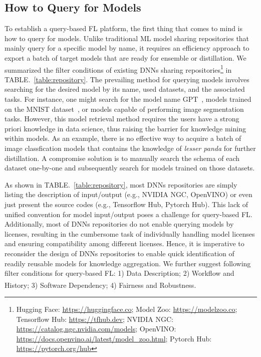 
\subsection{How to Query for Models}
\label{sec:how2query}
To establish a query-based FL platform, the first thing that comes to mind is how to query for models.
Unlike traditional ML model sharing repositories that mainly query for a specific model by name, it requires an efficiency approach to export a batch of target models that are ready for ensemble or distillation.
We summarized the filter conditions of existing DNNs sharing repositories\footnote{Hugging Face: \url{https://huggingface.co}; Model Zoo: \url{https://modelzoo.co}; Tensorflow Hub: \url{https://tfhub.dev}; NVIDIA NGC: \url{https://catalog.ngc.nvidia.com/models};  OpenVINO: \url{https://docs.openvino.ai/latest/model\_zoo.html}; Pytorch Hub: \url{https://pytorch.org/hub}} in TABLE.~\ref{table:repository}.
The prevailing method for querying models involves searching for the desired model by its name, used datasets, and the associated tasks.
For instance, one might search for the model name GPT~\cite{radford2019language}, models trained on the MNIST dataset~\cite{lecun2010mnist}, or models capable of performing image segmentation tasks.
However, this model retrieval method requires the users have a strong priori knowledge in data science, thus raising the barrier for knowledge mining within models.
As an example, there is no effective way to acquire a batch of image classfication models that contains the knowledge of \textit{lesser panda} for further distillation.
A compromise solution is to manually search the schema of each dataset one-by-one and subsequently search for models trained on those datasets.

As shown in TABLE.~\ref{table:repository}, most DNNs repositories are simply listing the description of input/output (e.g., NVIDIA NGC, OpenVINO) or even just present the source codes (e.g., Tensorflow Hub, Pytorch Hub).
This lack of unified convention for model input/output poses a challenge for query-based FL.
Additionally, most of DNNs repositories do not enable querying models by licenses, resulting in the cumbersome task of individually handling model licenses and ensuring compatibility among different licenses.
Hence, it is imperative to reconsider the design of DNNs repositories to enable quick identification of readily reusable models for knowledge aggregation. 
We further suggest following filter conditions for query-based FL: 1) Data Description; 2) Workflow and History; 3) Software Dependency; 4) Fairness and Robustness\textsuperscript{}. %

